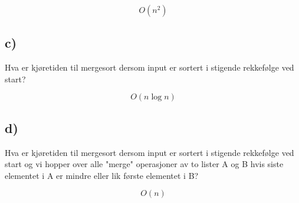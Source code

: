 \documentclass{article}
\begin{document}
    \begin{ans}
        \[ O(n^2) \]
    \end{ans}

    \subsection{c)}

    Hva er kjøretiden til mergesort dersom input er sortert i stigende rekkefølge ved start?

    \begin{ans}
    \[ O(n \log n) \]
    \end{ans}

    \subsection{d)}
    Hva er kjøretiden til mergesort dersom input er sortert i stigende rekkefølge ved start og vi hopper over alle "merge" operasjoner av to lister A og B hvis siste elementet i A er mindre eller lik første elementet i B?
    \begin{ans}
    \[ O(n) \]
    \end{ans}
\end{document}
